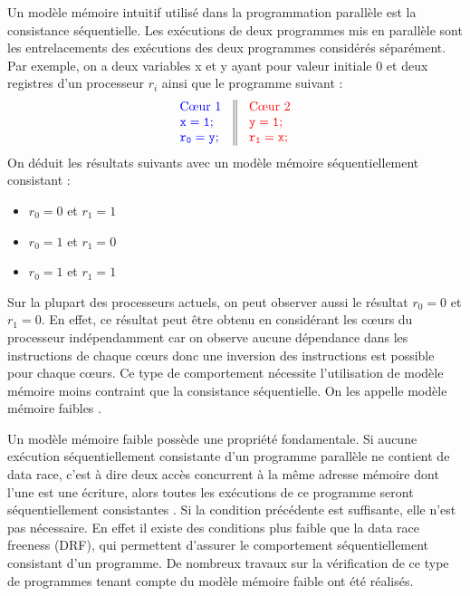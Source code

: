 \documentclass[12pt,a4paper]{article}
\begin{document}
Un modèle mémoire intuitif utilisé dans la programmation parallèle est la consistance séquentielle. Les exécutions de deux programmes mis en parallèle sont les entrelacements des exécutions des deux programmes considérés séparément. Par exemple, on a deux variables x et y ayant pour valeur initiale 0 et deux registres d'un processeur $r_i$ ainsi que le programme suivant :
\[
\begin{array}{c||c}
  \begin{array}{l}
    \textcolor[rgb]{0,0,1}{\text{C\oe{}ur 1}} \\
    \textcolor[rgb]{0,0,1}{\mathtt{x = 1;}} \\
    \textcolor[rgb]{0,0,1}{\mathtt{r_0 = y;}} \\
  \end{array} &
  \begin{array}{l}
    \textcolor[rgb]{1,0,0}{\text{C\oe{}ur 2}} \\
    \textcolor[rgb]{1,0,0}{\mathtt{y = 1;}} \\
    \textcolor[rgb]{1,0,0}{\mathtt{r_1 = x;}} \\
  \end{array}
\end{array}
\]
On déduit les résultats suivants avec un modèle mémoire séquentiellement consistant :
\begin{itemize}
	\item $r_0 = 0$ et $r_1 = 1$
	\item $r_0 = 1$ et $r_1 = 0$
	\item $r_0 = 1$ et $r_1 = 1$
\end{itemize} 
Sur la plupart des processeurs actuels, on peut observer aussi le résultat $r_0 = 0$ et $r_1 = 0$. En effet, ce résultat peut être obtenu en considérant les cœurs du processeur indépendamment car on observe aucune dépendance dans les instructions de chaque cœurs donc une inversion des instructions est possible pour chaque cœurs. Ce type de comportement nécessite l'utilisation de modèle mémoire moins contraint que la consistance séquentielle. On les appelle modèle mémoire faibles \cite{Adve:1996:SMC:619013.620590}. 

Un modèle mémoire faible possède une propriété fondamentale. Si aucune exécution séquentiellement consistante d'un programme parallèle ne contient de data race, c'est à dire deux accès concurrent  à la même adresse mémoire dont l'une est une écriture, alors toutes les exécutions de ce programme seront séquentiellement consistantes \cite{Saraswat:2007:TMM:1229428.1229469}.
Si la condition précédente est suffisante, elle n'est pas nécessaire. En effet il existe des conditions plus faible que la data race freeness (DRF), qui permettent d'assurer le comportement séquentiellement consistant d'un programme\cite{Owens:2010:RIC:1883978.1884011}. De nombreux travaux sur la vérification de ce type de programmes tenant compte du modèle mémoire faible ont été réalisés\cite{Turon:2014:GNW:2714064.2660243}.
\end{document}
